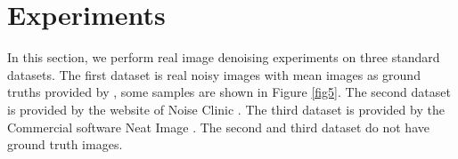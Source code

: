\documentclass[10pt,twocolumn,letterpaper]{article}
\begin{document}
\section{Experiments}
In this section, we perform real image denoising experiments on three standard datasets. The first dataset is real noisy images with mean images as ground truths provided by \cite{crosschannel2016}, some samples are shown in Figure \ref{fig5}. The second dataset is provided by the website of Noise Clinic \cite{noiseclinic}. The third dataset is provided by the Commercial software Neat Image \cite{neatimage}. The second and third dataset do not have ground truth images.
\begin{figure}[t]
\centering
{}
\end{figure}
\end{document}
